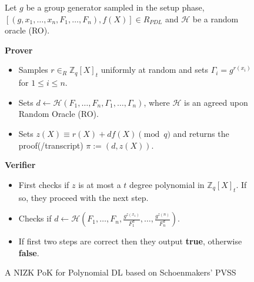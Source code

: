 \begin{figure}[ht]
    \centering
    \begin{tcolorbox}[title=$\pi_{PDL}$, width=0.9\textwidth, colframe=blue!75!black, colback=blue!10, sharp corners]
        Let $g$ be a group generator sampled in the setup phase, $[(g,x_1,\dots,x_n,F_1,\dots,F_n),f(X)]\in R_{PDL}$ and 
        $\mathcal{H}$ be a random oracle (RO).\par    
        \vspace{0.5em}
        \textbf{Prover}
        \begin{itemize}
            \item Samples $r\in_{R}\mathbb{Z}_q[X]_t$ uniformly at random and sets 
                $\Gamma_i=g^{r(x_i)}$ for $1\leq i\leq n$.
            \item Sets $d\leftarrow \mathcal{H}(F_1, \dots, F_n, \Gamma_1, \dots, \Gamma_n)$, where $\mathcal{H}$ is 
                an agreed upon Random Oracle (RO).
            \item Sets $z(X)\equiv r(X)+df(X) \pmod{q}$ and returns the proof(/transcript) $\pi:= (d,z(X))$.
        \end{itemize}
        
        \vspace{0.5em}
        \textbf{Verifier}
        \begin{itemize}
            \item First checks if $z$ is at most a $t$ degree polynomial in $\mathbb{Z}_q[X]_t$. If so, they proceed with the next step.
            \item Checks if $d\leftarrow \mathcal{H}(F_1, \dots, F_n,\frac{g^{z(x_1)}}{F_1^d}, \dots, \frac{g^{z(n)}}{F_n^d})$. 
            \item If first two steps are correct then they output \textbf{true}, otherwise \textbf{false}.
        \end{itemize}
    \end{tcolorbox}
    \caption{A NIZK PoK for Polynomial DL based on Schoenmakers' PVSS}
    \label{fig:polynomial-dl}
\end{figure}
